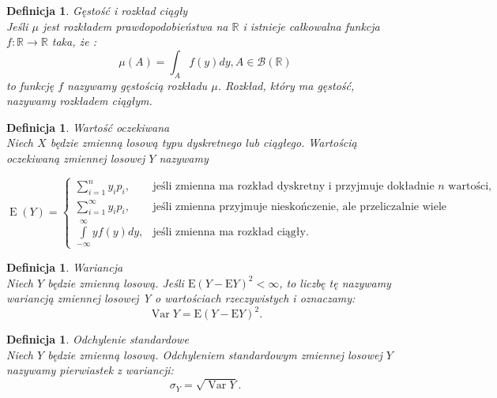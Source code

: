 \documentclass[12pt,a4paper]{report}
\newtheorem{definition}[theorem]{Definicja}
\newcommand{\Ex}{\operatorname{E}}
\newcommand{\Variance}{\operatorname{Var}}
\begin{document}
\begin{definition}{Gęstość i rozkład ciągły \cite[Rozdział 5.1]{jakubowski2004}}\\
Jeśli $\mu$ jest rozkładem prawdopodobieństwa na $\mathbb{R}$ i istnieje całkowalna funkcja $f: \mathbb{R} \rightarrow \mathbb{R}$ taka, że :
$$\mu(A)=\int_A f(y)dy,   A\in \mathcal{B}(\mathbb{R})  $$  %
to funkcję $f$ nazywamy gęstością rozkładu $\mu$. Rozkład, który ma gęstość, nazywamy rozkładem ciągłym. 
\end{definition}



\begin{definition}{Wartość oczekiwana \cite[Rozdział 2.6]{krysicki1999}}\\
Niech $X$ będzie zmienną losową typu dyskretnego lub ciągłego. Wartością oczekiwaną zmiennej losowej $Y$ nazywamy 

$$
\Ex (Y)=\left\{ \begin{array}{ll}
\sum\limits_{i=1}^{n} {y_ip_i}, & \textrm{jeśli zmienna ma rozkład dyskretny i przyjmuje dokładnie $n$ wartości, }\\ 
\sum\limits_{i=1}^{\infty} {y_ip_i}, & \textrm{jeśli zmienna przyjmuje nieskończenie, ale przeliczalnie wiele wartości,}\\
\int\limits_{-\infty}^{\infty} {yf(y)dy}, & \textrm{jeśli zmienna ma rozkład ciągły.}
\end{array} \right.
$$

\end{definition}


\begin{definition}{Wariancja \cite[Rozdział 5.6]{jakubowski2004}}\\
Niech $Y$ będzie zmienną losową. Jeśli $\mathrm{E}(Y-\mathrm{E}Y)^2 < \infty$, to liczbę tę nazywamy wariancją zmiennej losowej Y o wartościach rzeczywistych i oznaczamy: 
$$\Variance Y= \mathrm{E}(Y-\mathrm{E}Y)^2.$$
\end{definition}


\begin{definition}{Odchylenie standardowe \cite[Rozdział 5.6]{jakubowski2004}}\\
Niech $Y$ będzie zmienną losową. Odchyleniem standardowym zmiennej losowej $Y$ nazywamy pierwiastek z wariancji:
$$\sigma_Y=\sqrt{\Variance Y}.$$

\end{definition}
\end{document}
